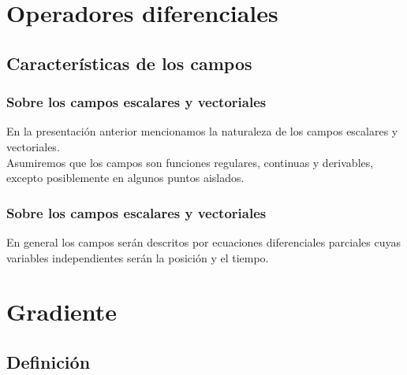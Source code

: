 \documentclass[12pt]{beamer}
\begin{document}
\section{Operadores diferenciales}
\subsection{Características de los campos}

\begin{frame}
\frametitle{Sobre los campos escalares y vectoriales}
En la presentación anterior mencionamos la naturaleza de los campos escalares y vectoriales.
\\
\bigskip
\pause
Asumiremos que los campos son funciones regulares, continuas y derivables, excepto posiblemente en algunos puntos aislados.
\end{frame}
\begin{frame}
\frametitle{Sobre los campos escalares y vectoriales}
En general los campos serán descritos por ecuaciones diferenciales parciales cuyas variables independientes serán la posición y el tiempo.
\end{frame}

\section{Gradiente}
\subsection{Definición}
\end{document}
